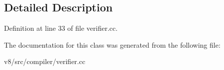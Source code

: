 \subsection{Detailed Description}


Definition at line 33 of file verifier.\+cc.



The documentation for this class was generated from the following file\+:\begin{DoxyCompactItemize}
\item 
v8/src/compiler/verifier.\+cc\end{DoxyCompactItemize}
